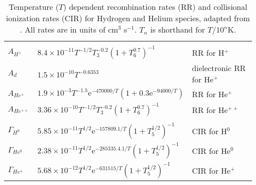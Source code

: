 \begin{table}
\begin{center}
\begin{tabular}{lll}
\hline\\
$A_{H^+}         $ & 
    $8.4 \times 10^{-11} T^{-1/2} T_3^{-0.2} (1 + T_6^{0.7})^{-1}$ & 
    RR for H$^{+}$ 
\\[.5em]
$A_{d}           $ &
    $1.5 \times 10^{-10} T^{-0.6353}$    & 
    dielectronic RR for He$^{+}$ 
\\[.5em]
$A_{He^+}        $ & 
    $1.9 \times 10^{-3} T^{-1.5} \mathrm{e}^{-470000/T} (1 + 0.3 \mathrm{e}^{-94000/T})$    & 
    RR for He$^{+}$
\\[.5em]
$A_{He^{++}}     $ & 
    $3.36 \times 10^{-10} T^{-1/2} T_3^{-0.2} (1 + T_6^{0.7})^{-1}$    & 
    RR for He$^{++}$
\\[.5em]
\hline\\
$\Gamma_{H^{0}}  $ & 
    $5.85 \times 10^{-11} T^{1/2} \mathrm{e}^{-157809.1/T} ( 1 + T_5^{1/2})^{-1}$& 
    CIR for H$^{0}$
\\[.5em]
$\Gamma_{He^{0}} $ & 
    $2.38 \times 10^{-11} T^{1/2} \mathrm{e}^{-285335.4.1/T} ( 1 + T_5^{1/2})^{-1}$& 
    CIR for He$^{0}$
\\[.5em]
$\Gamma_{He^{+}} $ & 
    $5.68 \times 10^{-12} T^{1/2} \mathrm{e}^{-631515/T} ( 1 + T_5^{1/2})^{-1}$& 
    CIR for He$^{+}$
\\[.5em]
\hline
\end{tabular}
\end{center}
\caption{Temperature ($T$) dependent recombination rates (RR) and collisional ionization rates 
(CIR) for Hydrogen and Helium species, adapted from \citet{katzCosmologicalSimulationsTreeSPH1996}. 
All rates are in units of cm$^3$ s$^{-1}$. $T_n$ is shorthand for $T / 10^n$K.}
\label{tab:coll-ion-rates-katz}
\end{table}

